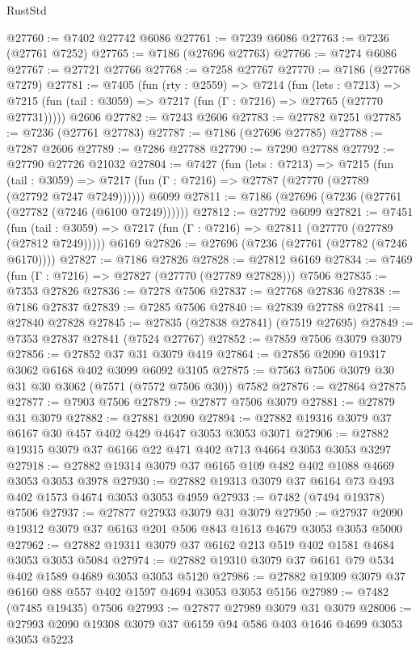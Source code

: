 \begin{lexlean}{RustStd}
\begin{coremodule}
@27760 := @7402 @27742 @6086
@27761 := @7239 @6086
@27763 := @7236 (@27761 @7252)
@27765 := @7186 (@27696 @27763)
@27766 := @7274 @6086
@27767 := @27721 @27766
@27768 := @7258 @27767
@27770 := @7186 (@27768 @7279)
@27781 := @7405
    (fun (rty : @2559) =>
    @7214
      (fun (lets : @7213) =>
      @7215 (fun (tail : @3059) => @7217 (fun (Γ : @7216) => @27765 (@27770 @27731)))))
    @2606
@27782 := @7243 @2606
@27783 := @27782 @7251
@27785 := @7236 (@27761 @27783)
@27787 := @7186 (@27696 @27785)
@27788 := @7287 @2606
@27789 := @7286 @27788
@27790 := @7290 @27788
@27792 := @27790 @27726 @21032
@27804 := @7427
    (fun (lets : @7213) =>
    @7215
      (fun (tail : @3059) =>
      @7217 (fun (Γ : @7216) => @27787 (@27770 (@27789 (@27792 @7247 @7249))))))
    @6099
@27811 := @7186 (@27696 (@7236 (@27761 (@27782 (@7246 (@6100 @7249))))))
@27812 := @27792 @6099
@27821 := @7451
    (fun (tail : @3059) => @7217 (fun (Γ : @7216) => @27811 (@27770 (@27789 (@27812 @7249)))))
    @6169
@27826 := @27696 (@7236 (@27761 (@27782 (@7246 @6170))))
@27827 := @7186 @27826
@27828 := @27812 @6169
@27834 := @7469 (fun (Γ : @7216) => @27827 (@27770 (@27789 @27828))) @7506
@27835 := @7353 @27826
@27836 := @7278 @7506
@27837 := @27768 @27836
@27838 := @7186 @27837
@27839 := @7285 @7506
@27840 := @27839 @27788
@27841 := @27840 @27828
@27845 := @27835 (@27838 @27841) (@7519 @27695)
@27849 := @7353 @27837 @27841 (@7524 @27767)
@27852 := @7859 @7506 @3079 @3079
@27856 := @27852 @37 @31 @3079 @419
@27864 := @27856 @2090 @19317 @3062 @6168 @402 @3099 @6092 @3105
@27875 := @7563 @7506 @3079 @30 @31 @30 @3062 (@7571 (@7572 @7506 @30)) @7582
@27876 := @27864 @27875
@27877 := @7903 @7506
@27879 := @27877 @7506 @3079
@27881 := @27879 @31 @3079
@27882 := @27881 @2090
@27894 := @27882 @19316 @3079 @37 @6167 @30 @457 @402 @429 @4647 @3053 @3053 @3071
@27906 := @27882 @19315 @3079 @37 @6166 @22 @471 @402 @713 @4664 @3053 @3053 @3297
@27918 := @27882 @19314 @3079 @37 @6165 @109 @482 @402 @1088 @4669 @3053 @3053 @3978
@27930 := @27882 @19313 @3079 @37 @6164 @73 @493 @402 @1573 @4674 @3053 @3053 @4959
@27933 := @7482 (@7494 @19378) @7506
@27937 := @27877 @27933 @3079 @31 @3079
@27950 := @27937 @2090 @19312 @3079 @37 @6163 @201 @506 @843 @1613 @4679 @3053 @3053 @5000
@27962 := @27882 @19311 @3079 @37 @6162 @213 @519 @402 @1581 @4684 @3053 @3053 @5084
@27974 := @27882 @19310 @3079 @37 @6161 @79 @534 @402 @1589 @4689 @3053 @3053 @5120
@27986 := @27882 @19309 @3079 @37 @6160 @88 @557 @402 @1597 @4694 @3053 @3053 @5156
@27989 := @7482 (@7485 @19435) @7506
@27993 := @27877 @27989 @3079 @31 @3079
@28006 := @27993 @2090 @19308 @3079 @37 @6159 @94 @586 @403 @1646 @4699 @3053 @3053 @5223

\end{coremodule}
\end{lexlean}
